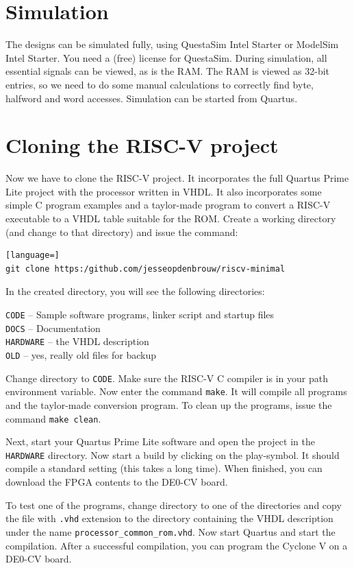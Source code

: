\documentclass[12pt]{article}
\begin{document}
\section{Simulation}
The designs can be simulated fully, using QuestaSim Intel Starter or ModelSim Intel Starter. You need a (free) license for QuestaSim. During simulation, all essential signals can be viewed, as is the RAM. The RAM is viewed as 32-bit entries, so we need to do some manual calculations to correctly find byte, halfword and word accesses. Simulation can be started from Quartus.

\section{Cloning the RISC-V project}
\label{sec:cloning}
Now we have to clone the RISC-V project. It incorporates the full Quartus Prime Lite project with the processor written in VHDL. It also incorporates some simple C program examples and a taylor-made program to convert a RISC-V executable to a VHDL table suitable for the ROM. Create a working directory (and change to that directory) and issue the command:

\begin{lstlisting}[language=]
git clone https:/github.com/jesseopdenbrouw/riscv-minimal
\end{lstlisting}

In the created directory, you will see the following directories:

\texttt{CODE} -- Sample software programs, linker script and startup files\\
\texttt{DOCS} -- Documentation\\
\texttt{HARDWARE} -- the VHDL description \\
\texttt{OLD} -- yes, really old files for backup

Change directory to \texttt{CODE}. Make sure the RISC-V C compiler is in your path environment variable. Now enter the command \texttt{make}. It will compile all programs and the taylor-made conversion program. To clean up the programs, issue the command \texttt{make clean}.

Next, start your Quartus Prime Lite software and open the project in the \texttt{HARDWARE} directory. Now start a build by clicking on the play-symbol. It should compile a standard setting (this takes a long time). When finished, you can download the FPGA contents to the DE0-CV board.

To test one of the programs, change directory to one of the directories and copy the file with \texttt{.vhd} extension to the directory containing the VHDL description under the name \texttt{processor\_common\_rom.vhd}.
Now start Quartus and start the compilation. After a successful compilation, you can program the Cyclone V on a DE0-CV board.
\end{document}
